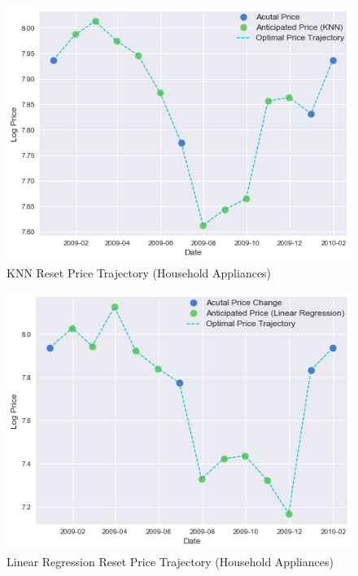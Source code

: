 \documentclass[11pt]{article}
\begin{document}
\begin{figure}[ht]
    \centering
    \caption{KNN Reset Price Trajectory (Household Appliances)}
    \includegraphics[scale=.8]{knn_reset2.png}

\end{figure}

\begin{figure}[ht]
    \centering
       \caption{Linear Regression Reset Price Trajectory (Household Appliances)}
    \includegraphics[scale=.8]{linear_reset2.png}

\end{figure}
\end{document}
